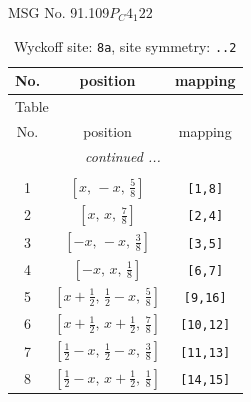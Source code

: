 \documentclass[fleqn,8pt]{jsarticle}
\begin{document}
\setcounter{MaxMatrixCols}{32}

\renewcommand{\tablename}{Table~}
\renewcommand{\figurename}{Figure~}
\begin{center}
\LARGE
MSG No. 91.109\quad$P_{C}4_{1}22$
\end{center}
\renewcommand{\arraystretch}{1.2}
\begin{longtable}{ccc}
\caption{Wyckoff site: {\tt 8a}, site symmetry: {\tt ..2}}
 \\
 \hline \hline
No. & position & mapping \\ \hline \endfirsthead

\multicolumn{2}{l}{\tablename\ \thetable{}} \\
 \hline \hline
No. & position & mapping \\ \hline \endhead

 \hline \hline
\multicolumn{2}{r}{\footnotesize\it continued ...} \\ \endfoot

 \hline \hline
\multicolumn{2}{r}{} \\ \endlastfoot

1 & $\left[ x,\, - x,\, \frac{5}{8} \right]$ & {\tt [1,8]} \\ \hline
2 & $\left[ x,\, x,\, \frac{7}{8} \right]$ & {\tt [2,4]} \\ \hline
3 & $\left[ - x,\, - x,\, \frac{3}{8} \right]$ & {\tt [3,5]} \\ \hline
4 & $\left[ - x,\, x,\, \frac{1}{8} \right]$ & {\tt [6,7]} \\ \hline
5 & $\left[ x + \frac{1}{2},\, \frac{1}{2} - x,\, \frac{5}{8} \right]$ & {\tt [9,16]} \\ \hline
6 & $\left[ x + \frac{1}{2},\, x + \frac{1}{2},\, \frac{7}{8} \right]$ & {\tt [10,12]} \\ \hline
7 & $\left[ \frac{1}{2} - x,\, \frac{1}{2} - x,\, \frac{3}{8} \right]$ & {\tt [11,13]} \\ \hline
8 & $\left[ \frac{1}{2} - x,\, x + \frac{1}{2},\, \frac{1}{8} \right]$ & {\tt [14,15]} \\
\end{longtable}
\renewcommand{\arraystretch}{1.2}
\end{document}
